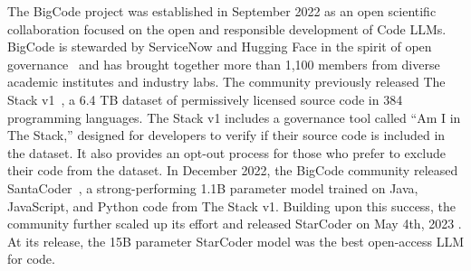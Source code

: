 \documentclass[10pt]{article} %
\begin{document}
The BigCode project was established in September 2022 as an open scientific collaboration focused on the open and responsible development of Code LLMs. BigCode is stewarded by ServiceNow and Hugging Face in the spirit of open governance~\citep{bigcodecollaboration2023bigcode} and has brought together more than 1,100 members from diverse academic
institutes and industry labs. The community previously released The Stack v1~\citep{kocetkov2023stack}, a 6.4 TB dataset of permissively licensed source code in 384 programming languages. The Stack v1 includes a governance tool called ``Am I in The Stack,'' designed for developers to verify if their source code is included in the dataset. It also provides an opt-out process for those who prefer to exclude their code from the dataset. In December 2022, the BigCode community released SantaCoder~\citep{allal2023santacoder}, a strong-performing 1.1B parameter model trained on Java, JavaScript, and Python code from The Stack v1. Building upon this success, the community further scaled up its effort and released StarCoder on May 4th, 2023 \citep{li2023starcoder}. At its release, the 15B parameter StarCoder model was the best open-access LLM for code. 
\end{document}
